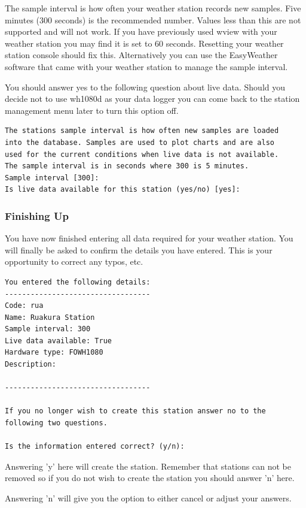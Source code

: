 \documentclass[a4paper,10pt,draft]{book}
\begin{document}
The sample interval is how often your weather station records new samples. Five minutes (300 seconds) is the recommended number. Values less than this are not supported and will not work. If you have previously used wview with your weather station you may find it is set to 60 seconds. Resetting your weather station console should fix this. Alternatively you can use the EasyWeather software that came with your weather station to manage the sample interval.

You should answer yes to the following question about live data. Should you decide not to use wh1080d as your data logger you can come back to the station management menu later to turn this option off.

\begin{verbatim}
The stations sample interval is how often new samples are loaded 
into the database. Samples are used to plot charts and are also 
used for the current conditions when live data is not available. 
The sample interval is in seconds where 300 is 5 minutes.
Sample interval [300]:
Is live data available for this station (yes/no) [yes]:
\end{verbatim}

\subsubsection{Finishing Up}
You have now finished entering all data required for your weather station. You will finally be asked to confirm the details you have entered. This is your opportunity to correct any typos, etc.

\begin{verbatim}
You entered the following details:
----------------------------------
Code: rua
Name: Ruakura Station
Sample interval: 300
Live data available: True
Hardware type: FOWH1080
Description:

----------------------------------

If you no longer wish to create this station answer no to the 
following two questions.

Is the information entered correct? (y/n):
\end{verbatim}

Answering 'y' here will create the station. Remember that stations can not be removed so if you do not wish to create the station you should answer 'n' here.

Answering 'n' will give you the option to either cancel or adjust your answers.
\end{document}
